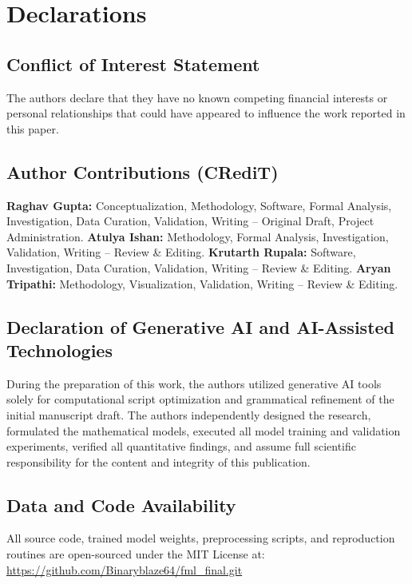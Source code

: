 \documentclass[10pt,twocolumn]{article}
\begin{document}
\section*{Declarations}

\subsection*{Conflict of Interest Statement}
The authors declare that they have no known competing financial interests or personal relationships that could have appeared to influence the work reported in this paper.

\subsection*{Author Contributions (CRediT)}
\textbf{Raghav Gupta:} Conceptualization, Methodology, Software, Formal Analysis, Investigation, Data Curation, Validation, Writing -- Original Draft, Project Administration. \textbf{Atulya Ishan:} Methodology, Formal Analysis, Investigation, Validation, Writing -- Review \& Editing. \textbf{Krutarth Rupala:} Software, Investigation, Data Curation, Validation, Writing -- Review \& Editing. \textbf{Aryan Tripathi:} Methodology, Visualization, Validation, Writing -- Review \& Editing.

\subsection*{Declaration of Generative AI and AI-Assisted Technologies}
During the preparation of this work, the authors utilized generative AI tools solely for computational script optimization and grammatical refinement of the initial manuscript draft. The authors independently designed the research, formulated the mathematical models, executed all model training and validation experiments, verified all quantitative findings, and assume full scientific responsibility for the content and integrity of this publication.

\subsection*{Data and Code Availability}
All source code, trained model weights, preprocessing scripts, and reproduction routines are open-sourced under the MIT License at: \url{https://github.com/Binaryblaze64/fml_final.git}
\end{document}
